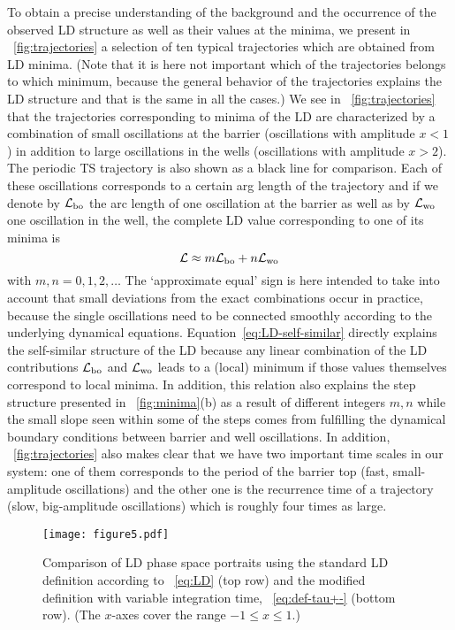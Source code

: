 \documentclass[aip,reprint,jcp,amsmath,amssymb,superscriptaddress,floatfix]{revtex4-1}
\begin{document}
To obtain a precise understanding of the background and the occurrence of the 
observed LD structure as well as their values at the minima, we present in 
\FIG~\ref{fig:trajectories} a selection of ten typical trajectories which are 
obtained from LD minima.
(Note that it is here not important which of the trajectories belongs to which 
minimum, because the general behavior of the trajectories explains the LD 
structure and that is the same in all the cases.)
% 
We see in \FIG~\ref{fig:trajectories} that the trajectories corresponding to 
minima of the LD are characterized by a combination of small 
oscillations at the barrier (oscillations with amplitude $x<1$) in addition 
to large oscillations in the wells (oscillations with amplitude $x>2$).
The periodic TS trajectory is also shown as a black line for comparison.
Each of these oscillations corresponds to a certain arg length of the 
trajectory and if we denote by $\mathcal{L}_\text{bo}$ the arc length of one oscillation at the 
barrier as well as by $\mathcal{L}_\text{wo}$ one oscillation in the well, the complete LD 
value corresponding to one of its minima is
% 
\begin{equation}
 \mathcal{L} \approx m \mathcal{L}_\text{bo} + n \mathcal{L}_\text{wo}
 \label{eq:LD-self-similar}
\end{equation}
% 
with $m,n=0,1,2,\ldots$
The `approximate equal' sign is here intended to take into account that small 
deviations from the exact combinations occur in practice, because the single 
oscillations need to be connected smoothly according to the underlying 
dynamical equations.
% 
Equation~\eqref{eq:LD-self-similar} directly explains the self-similar 
structure of the LD because any linear combination of the LD contributions 
$\mathcal{L}_\text{bo}$ and $\mathcal{L}_\text{wo}$ leads to a (local) minimum if those values themselves 
correspond to local minima.
In addition, this relation also explains the step structure presented in 
\FIG~\ref{fig:minima}(b) as a result of different integers $m,n$ while the 
small slope seen within some of the steps comes from fulfilling the dynamical 
boundary conditions between barrier and well oscillations.
% 
In addition, \FIG~\ref{fig:trajectories} also makes clear that we have two 
important time scales in our system:
one of them corresponds to the period of the barrier top (fast, 
small-amplitude oscillations) and the other one is the recurrence time of a 
trajectory (slow, big-amplitude oscillations) which is roughly four times as 
large.

\begin{figure*}[t]
\texttt{[image: figure5.pdf]}
\caption{%
Comparison of LD phase space portraits using the standard LD definition 
according to \EQ~\eqref{eq:LD} (top row) and the modified definition with 
variable integration time, \EQ~\eqref{eq:def-tau+-} (bottom row).
(The $x$-axes cover the range $-1 \leq x \leq 1$.)
}
\label{fig:LDs}
\end{figure*}
\end{document}
